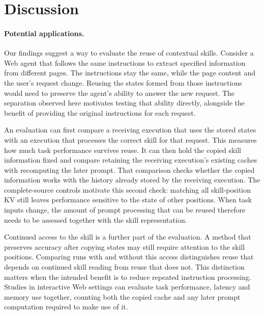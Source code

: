 \section{Discussion}
\label{sec:discussion}

\paragraph{Potential applications.}
Our findings suggest a way to evaluate the reuse of contextual skills.
Consider a Web agent that follows the same instructions to extract
specified information from different pages. The instructions stay the
same, while the page content and the user's request change. Reusing the
states formed from those instructions would need to preserve the agent's
ability to answer the new request. The separation observed here motivates
testing that ability directly, alongside the benefit of providing the
original instructions for each request.

An evaluation can first compare a receiving execution that uses the stored
states with an execution that processes the correct skill for that request.
This measures how much task performance survives reuse. It can then hold
the copied skill information fixed and compare retaining the receiving
execution's existing caches with recomputing the later prompt. That
comparison checks whether the copied information works with the history
already stored by the receiving execution. The complete-source controls
motivate this second check: matching all skill-position KV still leaves
performance sensitive to the state of other positions. When task inputs
change, the amount of prompt processing that can be reused therefore
needs to be assessed together with the skill representation.

Continued access to the skill is a further part of the evaluation.
A method that preserves accuracy after copying states may still require
attention to the skill positions. Comparing runs with and without this
access distinguishes reuse that depends on continued skill reading from
reuse that does not. This distinction matters when the intended
benefit is to reduce repeated instruction processing. Studies in
interactive Web settings can evaluate task performance, latency and
memory use together, counting both the copied cache and any later prompt
computation required to make use of it.

